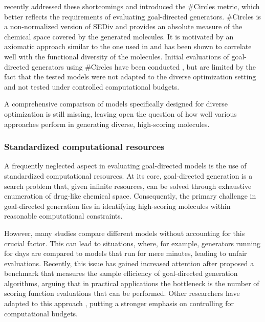 \citet{xieHowMuchSpace2023} recently addressed these shortcomings and introduced the \#Circles
metric, which better reflects the requirements of evaluating goal-directed generators. \#Circles is
a non-normalized version of \ac{SEDiv} and provides an absolute measure of the chemical space
covered by the generated molecules. It is motivated by an axiomatic approach similar to the one used
in \citep{waldmanNovelAlgorithmsOptimization2000} and has been shown to correlate well with the
functional diversity of the molecules. Initial evaluations of goal-directed generators
using \#Circles have been conducted \citep{xieHowMuchSpace2023}, but are limited by the fact that the tested models were not
adapted to the diverse optimization setting and not tested under controlled computational budgets.

A comprehensive comparison of models specifically designed for diverse optimization is still
missing, leaving open the question of how well various approaches perform in generating diverse,
high-scoring molecules.

\subsubsection{Standardized computational resources}
A frequently neglected aspect in evaluating goal-directed models is the use of standardized
computational resources. At its core, goal-directed generation is a search problem
that, given infinite resources, can be solved through exhaustive enumeration of drug-like chemical space.
Consequently, the primary challenge in goal-directed generation lies in identifying high-scoring molecules
within reasonable computational constraints.

However, many studies compare different models without accounting for this crucial factor. This can
lead to situations, where, for example, generators running for days are compared to models that run
for mere minutes, leading to unfair evaluations. Recently, this issue has gained increased attention
after \citep{gaoSampleEfficiencyMatters2022} proposed a benchmark that measures the sample
efficiency of goal-directed generation algorithms, arguing that in practical applications the
bottleneck is the number of scoring function evaluations that can be performed. Other researchers
have adapted to this approach
\citep{thomasReevaluatingSampleEfficiency2022,thomasAugmentedHillClimbIncreases2022,guoAugmentedMemorySampleEfficient2024},
putting a stronger emphasis on controlling for computational budgets.

